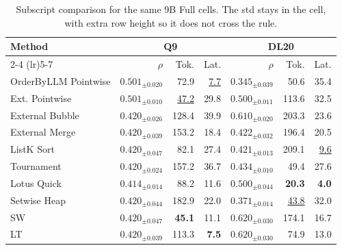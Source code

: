 \begin{table}[t]
\centering\footnotesize\setlength{\tabcolsep}{3.2pt}\renewcommand{\arraystretch}{1.45}
\caption{Subscript comparison for the same 9B Full cells. The std stays in the cell, with extra row height so it does not cross the rule.}
\begin{tabular}{@{}lrrrrrr@{}}
\toprule
Method & \multicolumn{3}{c}{Q9} & \multicolumn{3}{c}{DL20} \\
\cmidrule(lr){2-4} \cmidrule(lr){5-7}
 & $\rho$ & Tok. & Lat. & $\rho$ & Tok. & Lat. \\
\midrule
OrderByLLM Pointwise & \textbf{$0.501_{\pm0.020}$} & 72.9 & \underline{7.7} & $0.345_{\pm0.039}$ & 50.6 & 35.4 \\
Ext. Pointwise & \underline{$0.501_{\pm0.010}$} & \underline{47.2} & 29.8 & $0.500_{\pm0.011}$ & 113.6 & 32.5 \\
External Bubble & $0.420_{\pm0.026}$ & 128.4 & 39.9 & \underline{$0.610_{\pm0.020}$} & 203.3 & 23.6 \\
External Merge & $0.420_{\pm0.039}$ & 153.2 & 18.4 & $0.422_{\pm0.032}$ & 196.4 & 20.5 \\
ListK Sort & $0.420_{\pm0.047}$ & 82.1 & 27.4 & $0.421_{\pm0.013}$ & 209.1 & \underline{9.6} \\
Tournament & $0.420_{\pm0.024}$ & 157.2 & 36.7 & $0.434_{\pm0.010}$ & 49.4 & 27.6 \\
Lotus Quick & $0.414_{\pm0.014}$ & 88.2 & 11.6 & $0.500_{\pm0.044}$ & \textbf{20.3} & \textbf{4.0} \\
Setwise Heap & $0.420_{\pm0.044}$ & 182.9 & 22.0 & $0.371_{\pm0.014}$ & \underline{43.8} & 32.0 \\
SW & $0.420_{\pm0.047}$ & \textbf{45.1} & 11.1 & \textbf{$0.620_{\pm0.030}$} & 174.1 & 16.7 \\
LT & $0.420_{\pm0.039}$ & 113.3 & \textbf{7.5} & \textbf{$0.620_{\pm0.030}$} & 74.9 & 13.0 \\
\bottomrule
\end{tabular}
\end{table}

